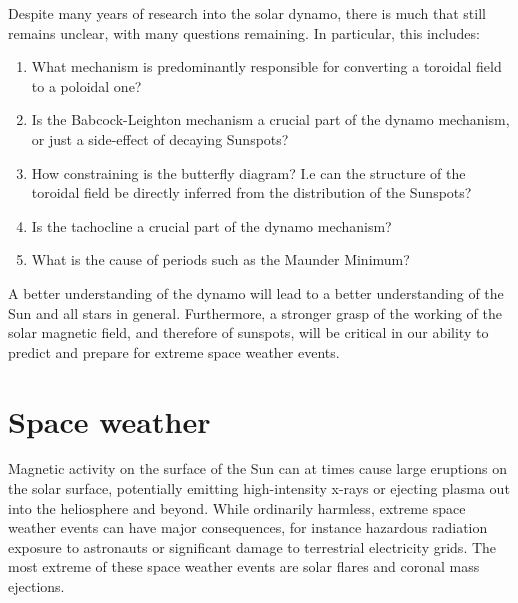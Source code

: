 \documentclass[11pt,a4paper,onecolumn]{report}
\begin{document}
Despite many years of research into the solar dynamo, there is much that still
remains unclear, with many questions remaining. In particular, this includes:
\begin{enumerate}
  \item What mechanism is predominantly responsible for converting a toroidal
  field to a poloidal one?

  \item Is the Babcock-Leighton mechanism a crucial part of the dynamo
  mechanism, or just a side-effect of decaying Sunspots?

  \item How constraining is the butterfly diagram? I.e can the structure of the toroidal field be
  directly inferred from the distribution of the Sunspots?

  \item Is the tachocline a crucial part of the dynamo mechanism?

  \item What is the cause of periods such as the Maunder Minimum?
\end{enumerate}
A better understanding of the dynamo will lead to a better understanding of the Sun
and all stars in general. Furthermore, a stronger grasp of the working of the
solar magnetic field, and therefore of sunspots, will be critical in our ability
to predict and prepare for extreme space weather events.








\section{Space weather}



Magnetic activity on the surface of the Sun can at times cause large eruptions
on the solar surface, potentially emitting high-intensity x-rays or ejecting
plasma out into the heliosphere and beyond. While ordinarily harmless, extreme
space weather events can have major consequences, for instance hazardous radiation exposure
to astronauts or significant damage to terrestrial electricity grids. The most extreme
of these space weather events are solar flares and coronal mass ejections. \\
\end{document}

